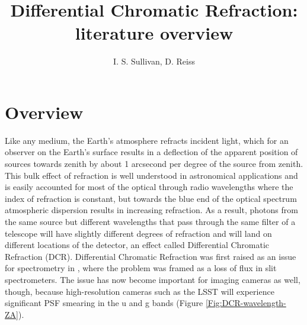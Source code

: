 \documentclass[]{article}
\title{Differential Chromatic Refraction: literature overview}
\author{I. S. Sullivan, D. Reiss}
\begin{document}
\maketitle


%

\section{Overview}
Like any medium, the Earth's atmosphere refracts incident light, which for an observer on the Earth's surface results in a deflection of the apparent position of sources towards zenith by about 1 arcsecond per degree of the source from zenith. This bulk effect of refraction is well understood in astronomical applications and is easily accounted for most of the optical through radio wavelengths where the index of refraction is constant, but towards the blue end of the optical spectrum atmospheric dispersion results in increasing refraction. As a result, photons from the same source but different wavelengths that pass through the same filter of a telescope will have slightly different degrees of refraction and will land on different locations of the detector, an effect called Differential Chromatic Refraction (DCR). Differential Chromatic Refraction was first raised as an issue for spectrometry in \cite{Filippenko1982}, where the problem was framed as a loss of flux in slit spectrometers. The issue has now become important for imaging cameras as well, though, because high-resolution cameras such as the LSST will experience significant PSF smearing in the u and g bands (Figure  \ref{Fig:DCR-wavelength-ZA}).
\end{document}
